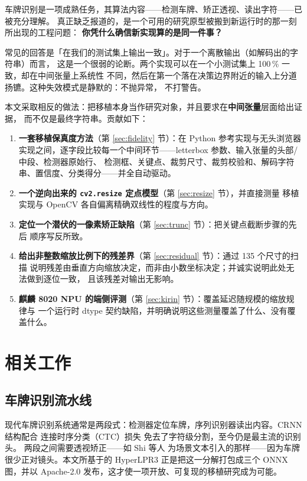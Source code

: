 \documentclass[UTF8,a4paper,11pt]{ctexart}
\begin{document}
车牌识别是一项成熟任务，其算法内容——检测车牌、矫正透视、读出字符——已被充分理解。
真正缺乏报道的，是一个可用的研究原型被搬到新运行时的那一刻所出现的工程问题：
\textbf{你凭什么确信新实现算的是同一件事？}

常见的回答是「在我们的测试集上输出一致」。对于一个离散输出（如解码出的字符串）而言，
这是一个很弱的论断。两个实现可以在一个小测试集上 100\,\% 一致，却在中间张量上系统性
不同，然后在第一个落在决策边界附近的输入上分道扬镳。这种失效模式是静默的：不抛异常，
不打警告。

本文采取相反的做法：把移植本身当作研究对象，并且要求在\textbf{中间张量}层面给出证据，
而不仅是最终字符串。贡献如下：

\begin{enumerate}
\item \textbf{一套移植保真度方法}（第 \ref{sec:fidelity} 节）：在 Python 参考实现与无头浏览器
实现之间，逐字段比较每一个中间环节——letterbox 参数、输入张量的头部/中段、检测器原始行、
检测框、关键点、裁剪尺寸、裁剪校验和、解码字符串、置信度、分类得分——并全自动驱动。
\item \textbf{一个逆向出来的 \texttt{cv2.resize} 定点模型}（第 \ref{sec:resize} 节），并直接测量
移植实现与 OpenCV 各自偏离精确双线性的程度与方向。
\item \textbf{定位一个潜伏的一像素矫正缺陷}（第 \ref{sec:trunc} 节）：把关键点截断步骤的先后
顺序写反所致。
\item \textbf{给出非整数缩放比例下的残差界}（第 \ref{sec:residual} 节）：通过 135 个尺寸的扫描
说明残差由垂直方向缩放决定，而非由小数坐标决定；并诚实说明此处无法做到逐位一致，
且该残差对输出无影响。
\item \textbf{麒麟 8020 NPU 的端侧评测}（第 \ref{sec:kirin} 节）：覆盖延迟随规模的缩放规律与
一个运行时 dtype 契约缺陷，并明确说明这些测量覆盖了什么、没有覆盖什么。
\end{enumerate}

\section{相关工作}

\subsection{车牌识别流水线}
现代车牌识别系统通常是两段式：检测器定位车牌，序列识别器读出内容。CRNN 结构配合
连接时序分类（CTC）损失 \cite{graves2006} 免去了字符级分割，至今仍是最主流的识别头。
两段之间需要透视矫正——如 Shi 等人 \cite{shi2016} 为场景文本引入的那样——因为车牌
很少正对镜头。本文所基于的 HyperLPR3 \cite{hyperlpr} 正是把这一分解打包成三个 ONNX
图，并以 Apache-2.0 发布，这才使一项开放、可复现的移植研究成为可能。
\end{document}
